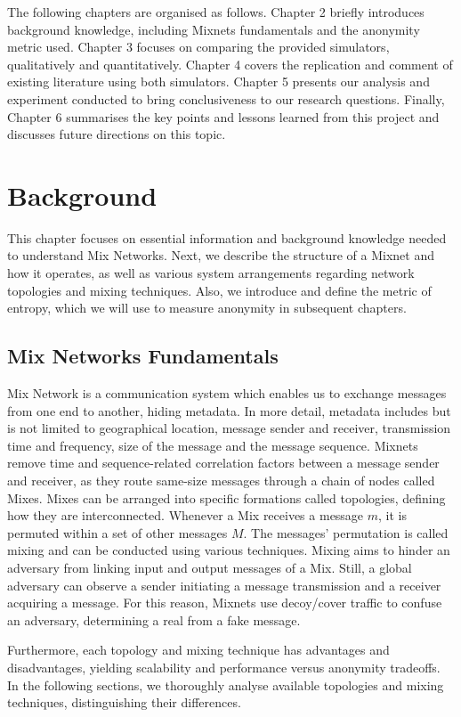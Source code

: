 \documentclass[logo,msc,cyber]{infthesis}   %
\begin{document}
The following chapters are organised as follows. Chapter 2 briefly introduces
background knowledge, including Mixnets fundamentals and the anonymity metric
used. Chapter 3 focuses on comparing the provided simulators, qualitatively and
quantitatively. Chapter 4 covers the replication and comment of existing
literature using both simulators. Chapter 5 presents our analysis and experiment
conducted to bring conclusiveness to our research questions. Finally, Chapter 6
summarises the key points and lessons learned from this project and discusses
future directions on this topic.


\chapter{Background}
This chapter focuses on essential information and background knowledge needed to
understand Mix Networks. Next, we describe the structure of a Mixnet and how it
operates, as well as various system arrangements regarding network topologies
and mixing techniques. Also, we introduce and define the metric of entropy,
which we will use to measure anonymity in subsequent chapters.

\section{Mix Networks Fundamentals} 

Mix Network is a communication system which enables us to exchange messages from
one end to another, hiding metadata. In more detail, metadata includes but is
not limited to geographical location, message sender and receiver, transmission
time and frequency, size of the message and the message sequence. Mixnets remove
time and sequence-related correlation factors between a message sender and
receiver, as they route same-size messages through a chain of nodes called Mixes.
Mixes can be arranged into specific formations called topologies, defining how
they are interconnected. Whenever a Mix receives a message $m$, it is permuted
within a set of other messages $M$\cite{erodotos}. The messages' permutation is
called mixing and can be conducted using various techniques. Mixing aims to
hinder an adversary from linking input and output messages of a Mix. Still, a
global adversary can observe a sender initiating a message transmission and a
receiver acquiring a message. For this reason, Mixnets use decoy/cover traffic
to confuse an adversary, determining a real from a fake message. 

Furthermore, each topology and mixing technique has advantages and
disadvantages, yielding scalability and performance versus anonymity tradeoffs.
In the following sections, we thoroughly analyse available topologies
and mixing techniques, distinguishing their differences.
\end{document}
